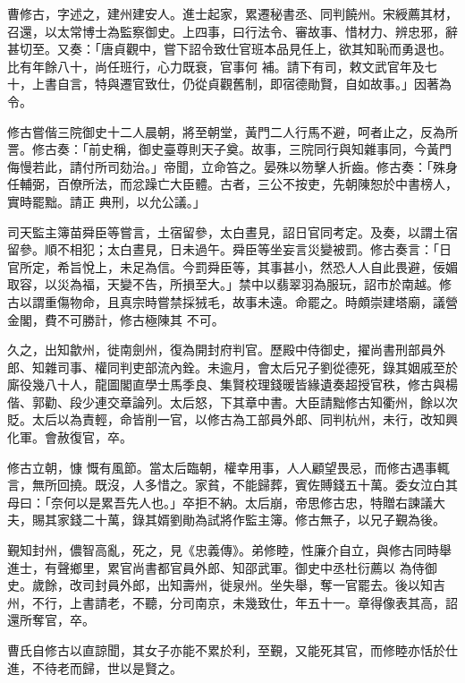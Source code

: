\begin{pinyinscope}
 曹修古，字述之，建州建安人。進士起家，累遷秘書丞、同判饒州。宋綬薦其材，召還，以太常博士為監察御史。上四事，曰行法令、審故事、惜材力、辨忠邪，辭甚切至。又奏：「唐貞觀中，嘗下詔令致仕官班本品見任上，欲其知恥而勇退也。比有年餘八十，尚任班行，心力既衰，官事何
 補。請下有司，敕文武官年及七十，上書自言，特與遷官致仕，仍從貞觀舊制，即宿德勛賢，自如故事。」因著為令。



 修古嘗偕三院御史十二人晨朝，將至朝堂，黃門二人行馬不避，呵者止之，反為所詈。修古奏：「前史稱，御史臺尊則天子奠。故事，三院同行與知雜事同，今黃門侮慢若此，請付所司劾治。」帝聞，立命笞之。晏殊以笏擊人折齒。修古奏：「殊身任輔弼，百僚所法，而忿躁亡大臣體。古者，三公不按吏，先朝陳恕於中書榜人，實時罷黜。請正
 典刑，以允公議。」



 司天監主簿苗舜臣等嘗言，土宿留參，太白晝見，詔日官同考定。及奏，以謂土宿留參。順不相犯；太白晝見，日未過午。舜臣等坐妄言災變被罰。修古奏言：「日官所定，希旨悅上，未足為信。今罰舜臣等，其事甚小，然恐人人自此畏避，佞媚取容，以災為福，天變不告，所損至大。」禁中以翡翠羽為服玩，詔市於南越。修古以謂重傷物命，且真宗時嘗禁採狨毛，故事未遠。命罷之。時頗崇建塔廟，議營金閣，費不可勝計，修古極陳其
 不可。



 久之，出知歙州，徙南劍州，復為開封府判官。歷殿中侍御史，擢尚書刑部員外郎、知雜司事、權同判吏部流內銓。未逾月，會太后兄子劉從德死，錄其姻戚至於廝役幾八十人，龍圖閣直學士馬季良、集賢校理錢暖皆緣遺奏超授官秩，修古與楊偕、郭勸、段少連交章論列。太后怒，下其章中書。大臣請黜修古知衢州，餘以次貶。太后以為責輕，命皆削一官，以修古為工部員外郎、同判杭州，未行，改知興化軍。會赦復官，卒。



 修古立朝，慷
 慨有風節。當太后臨朝，權幸用事，人人顧望畏忌，而修古遇事輒言，無所回撓。既沒，人多惜之。家貧，不能歸葬，賓佐賻錢五十萬。委女泣白其母曰：「奈何以是累吾先人也。」卒拒不納。太后崩，帝思修古忠，特贈右諫議大夫，賜其家錢二十萬，錄其婿劉勛為試將作監主簿。修古無子，以兄子覲為後。



 覲知封州，儂智高亂，死之，見《忠義傳》。弟修睦，性廉介自立，與修古同時舉進士，有聲鄉里，累官尚書都官員外郎、知邵武軍。御史中丞杜衍薦以
 為侍御史。歲餘，改司封員外郎，出知壽州，徙泉州。坐失舉，奪一官罷去。後以知吉州，不行，上書請老，不聽，分司南京，未幾致仕，年五十一。章得像表其高，詔還所奪官，卒。



 曹氏自修古以直諒聞，其女子亦能不累於利，至覲，又能死其官，而修睦亦恬於仕進，不待老而歸，世以是賢之。




\end{pinyinscope}
